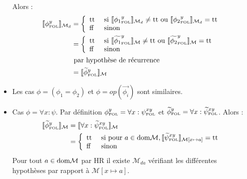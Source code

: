 \documentclass[12pt]{article}
\newcommand{\FOL}{\ensuremath{\textup{\tiny{}FOL}}}
\newcommand{\false}{\textup{ff}}
\newcommand{\true}{\textup{tt}}
\begin{document}
\begin{itemize}
  Alors : 
  \begin{align*}
    \llbracket \phi_\FOL^y \rrbracket_{\mathcal{M}_d}
    &= \left \{
      \begin{array}{l l}
        \true & \textup{ si }  \llbracket {\phi_1}_\FOL^y \rrbracket_{\mathcal{M}_d} \neq \true \textup{ ou } \llbracket {\phi_2}_\FOL^y \rrbracket_{\mathcal{M}_d} = \true \\
        \false & \textup{ sinon }
      \end{array}
             \right . \\
    &= \left \{
      \begin{array}{l l}
        \true & \textup{ si }  \llbracket {\widetilde{\phi_1}}_\FOL^y \rrbracket_{\mathcal{M}} \neq \true \textup{ ou } \llbracket {\widetilde{\phi_2}}_\FOL^y \rrbracket_{\mathcal{M}} = \true \\
        \false & \textup{ sinon }
      \end{array}
             \right . \\
    & \textup{ par hypothèse de récurrence } \\
    &= \llbracket {\widetilde{\phi}}_\FOL^y \rrbracket_{\mathcal{M}}
  \end{align*}
\item
  Les cas $\phi = (\phi_1 = \phi_2)$ et $\phi = op(\vec{\phi_i})$ sont similaires.
\item
  Cas $\phi = \forall x : \psi$.
  Par définition $\phi_\FOL^y = \forall x : {\psi}_\FOL^{xy}$ et $\widetilde{\phi}_\FOL^y = \forall x : \widetilde{\psi}_\FOL^{xy}$.
  Alors :
  \begin{align*}
    \llbracket \widetilde{\phi}_\FOL^y \rrbracket_{\mathcal{M}}
    &= \llbracket \forall x : \widetilde{\psi}_\FOL^{xy} \rrbracket_{\mathcal{M}} \\
    &= \left \{
      \begin{array}{l l}
        \true & \textup{ si pour } a \in \textup{dom} \mathcal{M}, \llbracket \widetilde{\psi}_\FOL^{xy} \rrbracket_{\mathcal{M}[x \mapsto a]} = \true \\
        \false & \textup{ sinon }
      \end{array}
                 \right . \\
  \end{align*}
  Pour tout $a \in \textup{dom}\mathcal{M}$ par HR il existe $\mathcal{M}_{da}$ vérifiant les différentes hypothèses par rapport à $\mathcal{M}[x \mapsto a]$.

\end{itemize}
\end{document}
